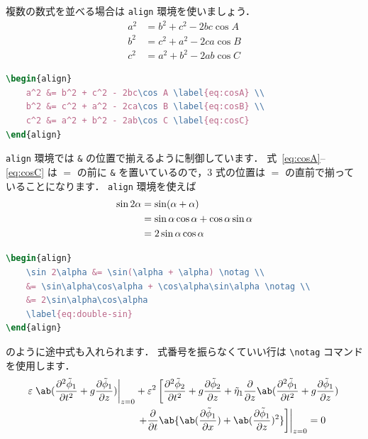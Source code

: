 \documentclass[
    paper=a4paper,      %
    article,            %
    fontsize=11pt,      %
    jafontsize=11pt,    %
    head_space=25mm,    %
    foot_space=25mm,    %
    gutter=20mm,        %
    fore-edge=20mm      %
    ]{jlreq}            %
\begin{document}
複数の数式を並べる場合は \verb|align| 環境を使いましょう．
\begin{align}
    a^2 &= b^2 + c^2 - 2bc\cos A \label{eq:cosA} \\
    b^2 &= c^2 + a^2 - 2ca\cos B \label{eq:cosB} \\
    c^2 &= a^2 + b^2 - 2ab\cos C \label{eq:cosC}
\end{align}
\begin{lstlisting}[language=TeX]
\begin{align}
    a^2 &= b^2 + c^2 - 2bc\cos A \label{eq:cosA} \\
    b^2 &= c^2 + a^2 - 2ca\cos B \label{eq:cosB} \\
    c^2 &= a^2 + b^2 - 2ab\cos C \label{eq:cosC}
\end{align}
\end{lstlisting}
\verb|align| 環境では \verb|&| の位置で揃えるように制御しています．
式~\eqref{eq:cosA}--\eqref{eq:cosC} は $=$ の前に \verb|&| を置いているので，3 式の位置は $=$ の直前で揃っていることになります．
\verb|align| 環境を使えば
\begin{align}
    \sin 2\alpha &= \sin(\alpha + \alpha) \notag \\
    &= \sin\alpha\cos\alpha + \cos\alpha\sin\alpha \notag \\
    &= 2\sin\alpha\cos\alpha
    \label{eq:double-sin}
\end{align}
\begin{lstlisting}[language=TeX]
\begin{align}
    \sin 2\alpha &= \sin(\alpha + \alpha) \notag \\
    &= \sin\alpha\cos\alpha + \cos\alpha\sin\alpha \notag \\
    &= 2\sin\alpha\cos\alpha
    \label{eq:double-sin}
\end{align}
\end{lstlisting}
のように途中式も入れられます．
式番号を振らなくていい行は \verb|\notag| コマンドを使用します．
\begin{align}
    \varepsilon\left.\ab(\pdv[order=2]{\tilde{\phi}_1}{t} + g\pdv{\tilde{\phi}_1}{z})\right|_{z=0} &+ \varepsilon^2\left[\pdv[order=2]{\tilde{\phi}_2}{t} + g\pdv{\tilde{\phi}_2}{z} + \tilde{\eta}_1\pdv{}{z}\ab(\pdv[order=2]{\tilde{\phi}_1}{t} + g\pdv{\tilde{\phi}_1}{z})\right. \notag \\
    &\left.\left.+ \pdv{}{t}\ab\{\ab(\pdv{\tilde{\phi}_1}{x}) + \ab(\pdv{\tilde{\phi}_1}{z})^2\}\right]\right|_{z=0} = 0
    \label{eq:multiple-lines}
\end{align}
\end{document}
